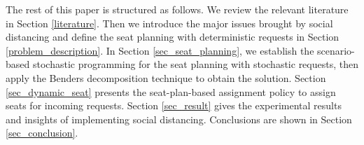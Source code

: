 The rest of this paper is structured as follows. We review the relevant literature in Section \ref{literature}. Then we introduce the major issues brought by social distancing and define the seat planning with deterministic requests in Section \ref{problem_description}. In Section \ref{sec_seat_planning}, we establish the scenario-based stochastic programming for the seat planning with stochastic requests, then apply the Benders decomposition technique to obtain the solution. Section \ref{sec_dynamic_seat} presents the seat-plan-based assignment policy to assign seats for incoming requests. Section \ref{sec_result} gives the experimental results and insights of implementing social distancing. Conclusions are shown in Section \ref{sec_conclusion}.
